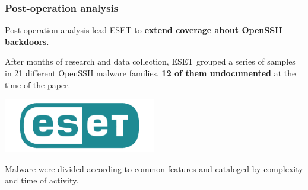 \begin{frame}
	\frametitle{Post-operation analysis}
	
	Post-operation analysis lead ESET to \textbf{extend coverage about OpenSSH backdoors}.
	
	\smallskip

	After months of research and data collection, ESET grouped a series of samples in 21 different OpenSSH malware families, \textbf{12 of them undocumented} at the time of the paper. 
	
	\begin{center}    
  \includegraphics[width=0.5\textwidth]{images/eset-logo}
  \end{center}

	\smallskip

  Malware were divided according to common features and cataloged by complexity and time of activity.  
	
\end{frame}
